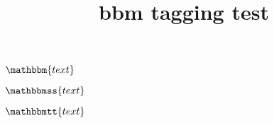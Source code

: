 \documentclass{article}
\title{bbm tagging test}
\begin{document}
$\mathbbm{text}$

$\mathbbmss{text}$

$\mathbbmtt{text}$
\end{document}
